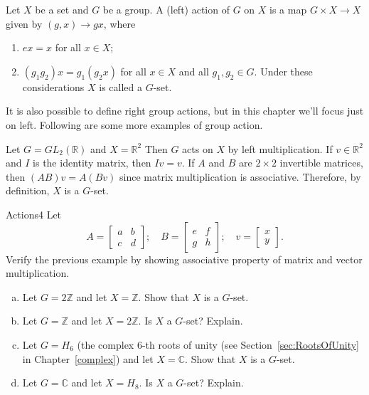 \begin{defn}
Let $X$ be a set and $G$ be a group. A (left) action of $G$ on $X$ is a map $G\times X\rightarrow X$
given by $(g, x)\rightarrow gx$, where
\begin{enumerate}[(1)]
\item $ex = x$ for all $x\in X$;
\item $(g_1g_2)x = g_1(g_2x)$ for all $x\in X$ and all $g_1, g_2 \in G$.
Under these considerations $X$ is called a $G$-set.
\end{enumerate}
\end{defn}
It is also possible to define right group actions, but in this chapter we'll focus just on left.  Following are some more examples of group action.

\begin{example}\label{example:actions:Actions3}
 Let $G = GL_2(\mathbb{R})$ and $X = \mathbb{R}^2$
Then $G$ acts on $X$ by left multiplication. If $v\in \mathbb{ R}^2$
and $I$ is the identity matrix, then $Iv = v$. If $A$ and $B$ are $2 \times 2$
invertible matrices, then $(AB)v = A(Bv)$ since matrix multiplication is associative.  Therefore, by definition, $X$ is a $G$-set.\end{example}

\begin {exercise}{Actions4}
Let
\begin{equation*}
A=\left[\begin {array}{cc}
a&b\\c&d\end{array}\right]; \quad 
B=\left[\begin{array}{cc} e& f\\ g & h\end{array}\right]; \quad 
v=\left[\begin{array}{c}x\\ y\end{array}\right].
\end{equation*}
Verify the previous example by showing associative property of matrix and vector multiplication. 
\end {exercise}

\begin{exercise}\label{exercise:actions:Action5}
\begin{enumerate}[(a)]
\item 
Let $G = 2\mathbb{Z}$ and let $X =\mathbb{Z}$. Show that $X$ is a $G$-set.
\item Let $G = \mathbb{Z}$ and let $X = 2\mathbb{Z}$. Is $X$ a $G$-set? Explain.
\item Let $G = H_6$ (the complex $6$-th roots of unity (see Section~\ref{sec:RootsOfUnity} in Chapter~\ref{complex}) and let $X =\mathbb{C}$. Show that $X$ is a $G$-set.
\item Let $G = \mathbb{C}$ and let $X = H_8$.  Is $X$ a $G$-set? Explain.
\end{enumerate}
\end{exercise}
